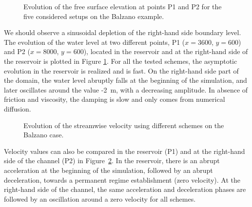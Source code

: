\begin{figure}[H]
\begin{minipage}[t]{0.5\textwidth}
 \centering
\end{minipage}%
\begin{minipage}[t]{0.5\textwidth}
 \centering
\end{minipage}
\caption{Evolution of the free surface elevation at points P1 and P2 for the five considered setups on the Balzano example.}
\label{fig:balzano:temporalSL}
\end{figure}

We should observe a sinusoidal depletion of the right-hand side boundary level.
The evolution of the water level at two different points, P1 ($x=3600$, $y=600$) and P2 ($x=8000$, $y=600$), located in the reservoir and at the right-hand side of the reservoir is plotted in Figure \ref{fig:balzano:temporalSL}.
For all the tested schemes, the asymptotic evolution in the reservoir is realized and is fast.
On the right-hand side part of the domain, the water level abruptly falls at the beginning of
the simulation, and later oscillates around the value -2~m,
with a decreasing amplitude. In absence of friction and viscosity, the damping is slow
and only comes from numerical diffusion.

\begin{figure}[H]
\begin{minipage}[t]{0.5\textwidth}
 \centering
\end{minipage}%
\begin{minipage}[t]{0.5\textwidth}
 \centering
\end{minipage}
\caption{Evolution of the streamwise velocity using different schemes on the Balzano case.}
\label{fig:balzano:temporalU}
\end{figure}

Velocity values can also be compared in the reservoir (P1) and at the right-hand side of the channel (P2) in Figure~\ref{fig:balzano:temporalU}.
In the reservoir, there is an abrupt acceleration at the beginning of the simulation, followed by an
abrupt deceleration, towards a permanent regime establishment (zero velocity).
At the right-hand side of the channel, the same acceleration and deceleration
phases are followed by an oscillation around a zero velocity for all schemes.

